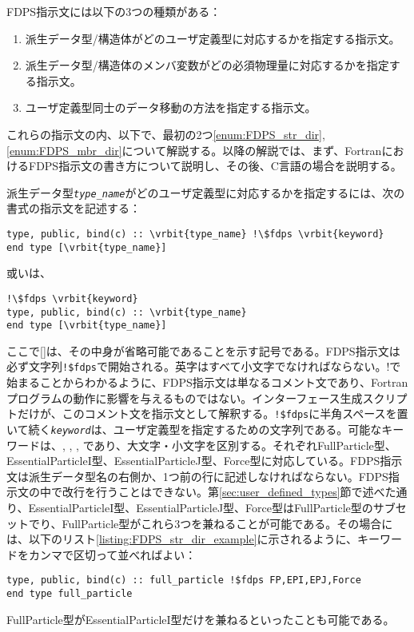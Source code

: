 FDPS指示文には以下の3つの種類がある：
\begin{enumerate}[leftmargin=*,itemsep=-1ex,label=(\alph*)]
\item 派生データ型/構造体がどのユーザ定義型に対応するかを指定する指示文。\label{enum:FDPS_str_dir}
\item 派生データ型/構造体のメンバ変数がどの必須物理量に対応するかを指定する指示文。\label{enum:FDPS_mbr_dir}
\item ユーザ定義型同士のデータ移動の方法を指定する指示文。\label{enum:FDPS_meth_dir}
\end{enumerate}
これらの指示文の内、以下で、最初の2つ\ref{enum:FDPS_str_dir},\ref{enum:FDPS_mbr_dir}について解説する。以降の解説では、まず、FortranにおけるFDPS指示文の書き方について説明し、その後、C言語の場合を説明する。

派生データ型\textit{\texttt{type\_name}}がどのユーザ定義型に対応するかを指定するには、次の書式の指示文を記述する：
\begin{screen}
\begin{Verbatim}[commandchars=\\\{\}]
type, public, bind(c) :: \vrbit{type_name} !\$fdps \vrbit{keyword}
end type [\vrbit{type_name}]
\end{Verbatim}
\end{screen}

或いは、

\begin{screen}
\begin{Verbatim}[commandchars=\\\{\}]
!\$fdps \vrbit{keyword}
type, public, bind(c) :: \vrbit{type_name}
end type [\vrbit{type_name}]
\end{Verbatim}
\end{screen}
ここで[]は、その中身が省略可能であることを示す記号である。FDPS指示文は必ず文字列\verb|!$fdps|で開始される。英字はすべて小文字でなければならない。!で始まることからわかるように、FDPS指示文は単なるコメント文であり、Fortranプログラムの動作に影響を与えるものではない。インターフェース生成スクリプトだけが、このコメント文を指示文として解釈する。\verb|!$fdps|に半角スペースを置いて続く\textit{\texttt{keyword}}は、ユーザ定義型を指定するための文字列である。可能なキーワードは、, , , であり、大文字・小文字を区別する。それぞれFullParticle型、EssentialParticleI型、EssentialParticleJ型、Force型に対応している。FDPS指示文は派生データ型名の右側か、1つ前の行に記述しなければならない。FDPS指示文の中で改行を行うことはできない。第\ref{sec:user_defined_types}節で述べた通り、EssentialParticleI型、EssentialParticleJ型、Force型はFullParticle型のサブセットでり、FullParticle型がこれら3つを兼ねることが可能である。その場合には、以下のリスト\ref{listing:FDPS_str_dir_example}に示されるように、キーワードをカンマで区切って並べればよい：
\begin{lstlisting}[caption=FullParticle型が他を兼ねる場合の例,label=listing:FDPS_str_dir_example]
type, public, bind(c) :: full_particle !$fdps FP,EPI,EPJ,Force
end type full_particle
\end{lstlisting}
FullParticle型がEssentialParticleI型だけを兼ねるといったことも可能である。

